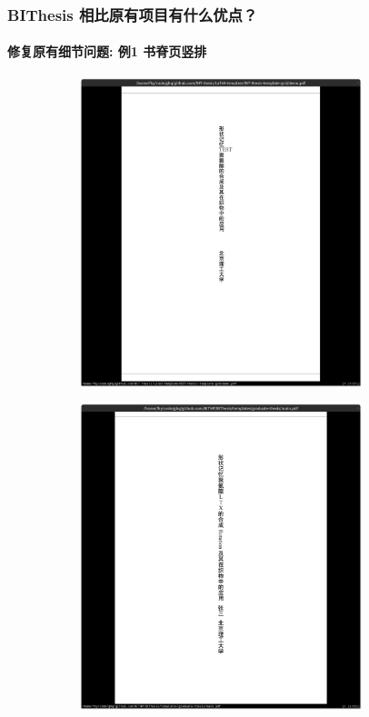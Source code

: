 \documentclass[
  aspectratio=169,
  presentation,
  titlegraphic=./images/bit.png,
  framelogo=./images/bit.png
]{bitbeamer}
\begin{document}
\begin{frame}[t]
  \frametitle{BIThesis 相比原有项目有什么优点？}
  \framesubtitle{修复原有细节问题: 例1 书脊页竖排}

  \vspace{-0.8cm}

  \begin{figure}
    \begin{subfigure}{0.45\textwidth}
      \includegraphics[width=0.9\textwidth]{images/5-1.png}
    \end{subfigure}
    \begin{subfigure}{0.45\textwidth}
      \includegraphics[width=0.9\textwidth]{images/5-2.png}
    \end{subfigure}
  \end{figure}
  
\end{frame}
\end{document}
